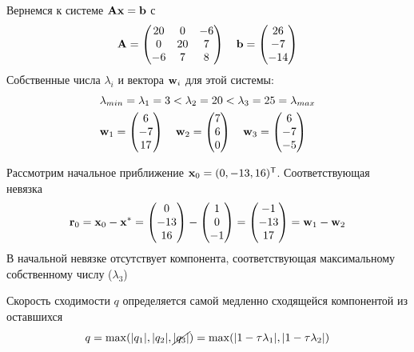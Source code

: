 \documentclass[professionalfonts,compress,unicode]{beamer}
\begin{document}
{
    Вернемся к системе ${\bf A}{\bf x} = {\bf b}$ с 
    \begin{equation*}
	{\bf A} = \begin{pmatrix}
	20 & 0 & -6\\
	0 & 20 & 7 \\
	-6 & 7 & 8 
	\end{pmatrix}
	\quad {\bf b} = \begin{pmatrix}
	26 \\ -7 \\ -14
	\end{pmatrix}
    \end{equation*}
    Собственные числа $\lambda_i$ и вектора ${\bf w}_i$ для этой системы:
    \begin{align*}
    &\lambda_{min} = \lambda_1 = 3 < 
    \lambda_2 = 20 < \lambda_3 = 25 =\lambda_{max}\\
    &
    {\bf w}_1 = \begin{pmatrix}
    6\\-7\\17
    \end{pmatrix} \quad
    {\bf w}_2 = \begin{pmatrix}
    7\\6\\0
    \end{pmatrix} \quad
    {\bf w}_3 = \begin{pmatrix}
    6\\-7\\-5
    \end{pmatrix}
    \end{align*}
}

{
    Рассмотрим начальное приближение ${\bf x}_0 = (0, -13, 16)^\mathsf{T}$. Соответствующая 
    невязка 
    \begin{equation*}
        {\bf r}_0 = {\bf x}_0 - {\bf x}^* = \begin{pmatrix}
            0\\ -13\\ 16
        \end{pmatrix} - 
        \begin{pmatrix}
            1\\ 0\\-1
        \end{pmatrix} =
        \begin{pmatrix}
            -1\\ -13\\ 17
        \end{pmatrix} = {\bf w}_1 - {\bf w}_2
    \end{equation*}
    В начальной невязке отсутствует компонента, соответствующая максимальному
    собственному числу ($\lambda_3$)

    Скорость сходимости $q$ определяется самой медленно сходящейся компонентой
    из оставшихся
    \begin{equation*}
        q = \max(|q_1|, |q_2|, \cancel{|q_3|}) = 
        \max(|1 - \tau \lambda_1|, |1 - \tau \lambda_2|)
    \end{equation*}
}
\end{document}
